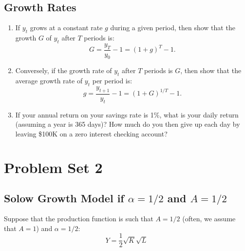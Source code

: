 \documentclass[]{book}
\theoremstyle{definition}
\theoremstyle{definition}
\theoremstyle{definition}
\theoremstyle{remark}
\begin{document}
\section{Growth Rates}\label{growth-rates}

\begin{enumerate}
\def\labelenumi{\arabic{enumi}.}
\item
  If \(y_t\) grows at a constant rate \(g\) during a given period, then
  show that the growth \(G\) of \(y_t\) after \(T\) periods is:
  \[G = \frac{y_T}{y_0}-1=(1+g)^T-1.\]
\item
  Conversely, if the growth rate of \(y_t\) after \(T\) periods is
  \(G\), then show that the average growth rate of \(y_t\) per period
  is: \[g = \frac{y_{t+1}}{y_{t}}-1=(1+G)^{1/T}-1.\]
\item
  If your annual return on your savings rate is 1\%, what is your daily
  return (assuming a year is 365 days)? How much do you then give up
  each day by leaving \$100K on a zero interest checking account?
\end{enumerate}

\hypertarget{pset2}{\chapter{Problem Set 2}\label{pset2}}

\section{\texorpdfstring{Solow Growth Model if \(\alpha = 1/2\) and
\(A=1/2\)}{Solow Growth Model if \textbackslash{}alpha = 1/2 and A=1/2}}\label{solow-growth-model-if-alpha-12-and-a12}

Suppose that the production function is such that \(A=1/2\) (often, we
assume that \(A=1\)) and \(\alpha=1/2\):
\[Y=\frac{1}{2}\sqrt{K}\sqrt{L}\]
\end{document}
